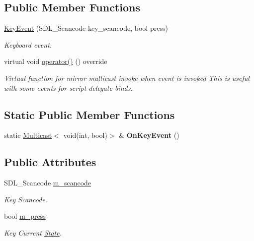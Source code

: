 \subsection*{Public Member Functions}
\begin{DoxyCompactItemize}
\item 
\hyperlink{classKeyEvent_ac4916846f8db231e87b912a3c15efb93}{Key\+Event} (S\+D\+L\+\_\+\+Scancode key\+\_\+scancode, bool press)
\begin{DoxyCompactList}\small\item\em Keyboard event. \end{DoxyCompactList}\item 
\mbox{\label{classKeyEvent_ae9ca60ae540185f25a329fcecee15bd2}} 
virtual void \hyperlink{classKeyEvent_ae9ca60ae540185f25a329fcecee15bd2}{operator()} () override
\begin{DoxyCompactList}\small\item\em Virtual function for mirror multicast invoke when event is invoked This is useful with some events for script delegate binds. \end{DoxyCompactList}\end{DoxyCompactItemize}
\subsection*{Static Public Member Functions}
\begin{DoxyCompactItemize}
\item 
\mbox{\label{classKeyEvent_af3334ba23b50d17be327199b7d45c23c}} 
static \hyperlink{classMulticast}{Multicast}$<$ void(int, bool)$>$ \& {\bfseries On\+Key\+Event} ()
\end{DoxyCompactItemize}
\subsection*{Public Attributes}
\begin{DoxyCompactItemize}
\item 
\mbox{\label{classKeyEvent_a355a05af666b7b6813a029be8d779eb3}} 
S\+D\+L\+\_\+\+Scancode \hyperlink{classKeyEvent_a355a05af666b7b6813a029be8d779eb3}{m\+\_\+scancode}
\begin{DoxyCompactList}\small\item\em Key Scancode. \end{DoxyCompactList}\item 
\mbox{\label{classKeyEvent_ac18e27df9b82af8999125d253c0730c9}} 
bool \hyperlink{classKeyEvent_ac18e27df9b82af8999125d253c0730c9}{m\+\_\+press}
\begin{DoxyCompactList}\small\item\em Key Current \hyperlink{classState}{State}. \end{DoxyCompactList}\end{DoxyCompactItemize}
